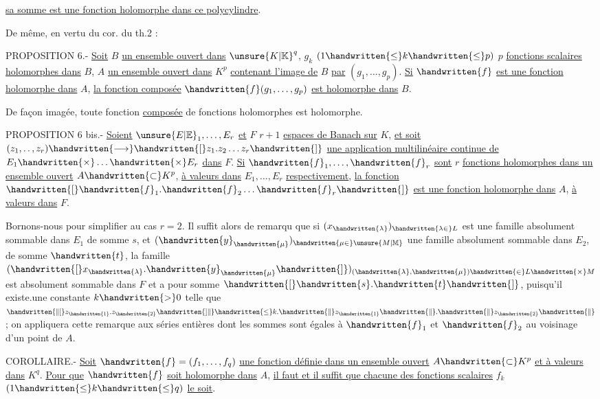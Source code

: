 \uline{sa somme est une fonction holomorphe dans ce polycylindre}.

De même, en vertu du cor. du th.2 :

PROPOSITION 6.- \uline{Soit} $B$ \uline{un ensemble ouvert dans} ${\unsure{K|\mathbb{K}}}^{q}$, $g_k$ $(1\handwritten{\leq}k\handwritten{\leq}p)$ $p$ \uline{fonctions scalaires holomorphes dans} $B$, $A$ \uline{un ensemble ouvert dans} $K^{p}$ \uline{contenant l'image de} $B$ \uline{par} $(g_1,\ldots,g_p)$. \uline{Si} $\handwritten{f}$ \uline{est une fonction holomorphe dans} $A$, \uline{la fonction composée} $\handwritten{f}(g_1,\ldots,g_p)$ \uline{est holomorphe dans} $B$.

De façon imagée, toute fonction \uline{composée} de fonctions holomorphes est holomorphe.

PROPOSITION 6 bis.- \uline{Soient} $\unsure{E|\mathbb{E}}_1,\ldots,E_r$ \uline{et} $F$ $r+1$ \uline{espaces de Banach sur} $K$, \uline{et soit} $(z_1,\ldotp\ldotp,z_r)\handwritten{\longrightarrow}\handwritten{[}z_1.z_2\ldots z_r\handwritten{]}$ \uline{une application multilinéaire continue de} $E_1\handwritten{\times}\ldots\handwritten{\times}E_r$ \uline{dans} $F$. \uline{Si} $\handwritten{f}_1,\ldots,\handwritten{f}_r$ \uline{sont} $r$ \uline{fonctions holomorphes dans un ensemble ouvert} $A\handwritten{\subset}K^p$, \uline{à valeurs dans} $E_1,\ldots,E_r$ \uline{respectivement}, \uline{la fonction} $\handwritten{[}\handwritten{f}_1.\handwritten{f}_2\ldots\handwritten{f}_r\handwritten{]}$ \uline{est une fonction holomorphe dans} $A$, \uline{à valeurs \handwritten{/}dans} $F$.

Bornons-nous pour simplifier au cas $r=2$. Il suffit alors de remarqu que si $(x_{\handwritten{\lambda}})_{\handwritten{\lambda\in}L}$ est une famille absolument sommable dans $E_1$ de somme $s$, et $(\handwritten{y}_{\handwritten{\mu}})_{\handwritten{\mu\in}\unsure{M|\mathbb{M}}}$ une famille absolument sommable dans $E_2$, de somme $\handwritten{t}$, la famille $(\handwritten{[}x_{\handwritten{\lambda}}.\handwritten{y}_{\handwritten{\mu}}\handwritten{]})_{(\handwritten{\lambda},\handwritten{\mu})\handwritten{\in}L\handwritten{\times}M}$ est absolument sommable dans $F$ et a pour somme $\handwritten{[}\handwritten{s}.\handwritten{t}\handwritten{]}$, puisqu'il existe.une constante $k\handwritten{>}0$ telle que $\handwritten{\|[}z_{\handwritten{1}}.z_{\handwritten{2}}\handwritten{]\|}\handwritten{\leq}k.\handwritten{\|}z_{\handwritten{1}}\handwritten{\|}.\handwritten{\|}z_{\handwritten{2}}\handwritten{\|}$ ; on appliquera cette remarque aux séries entières dont les sommes sont égales à $\handwritten{f}_1$ et $\handwritten{f}_2$ au voisinage d'un point de $A$.

COROLLAIRE.- \uline{Soit} $\handwritten{f}=(f_1,\ldots,f_q)$ \uline{une fonction définie dans un ensemble ouvert} $A\handwritten{\subset}K^p$ \uline{et à valeurs dans} $K^q$. \uline{Pour que} $\handwritten{f}$ \uline{soit holomorphe dans} $A$, \uline{il faut et il suffit que chacune des fonctions scalaires} $f_k$ $(1\handwritten{\leq}k\handwritten{\leq}q)$ \uline{le soit}.
